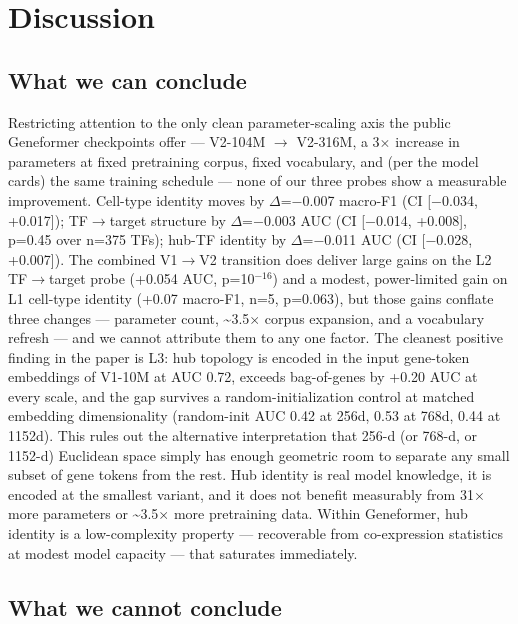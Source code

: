 \documentclass[10pt]{article}
\begin{document}
\section{Discussion}\label{discussion}

\subsection{What we can conclude}\label{what-we-can-conclude}

Restricting attention to the only clean parameter-scaling axis the
public Geneformer checkpoints offer --- V2-104M $\to$ V2-316M, a 3$\times$ increase
in parameters at fixed pretraining corpus, fixed vocabulary, and (per
the model cards) the same training schedule --- none of our three probes
show a measurable improvement. Cell-type identity moves by $\Delta$=$-$0.007
macro-F1 (CI {[}$-$0.034, +0.017{]}); TF$\to$target structure by $\Delta$=$-$0.003 AUC
(CI {[}$-$0.014, +0.008{]}, p=0.45 over n=375 TFs); hub-TF identity by
$\Delta$=$-$0.011 AUC (CI {[}$-$0.028, +0.007{]}). The combined V1$\to$V2 transition
does deliver large gains on the L2 TF$\to$target probe (+0.054 AUC, p=10$^{-16}$)
and a modest, power-limited gain on L1 cell-type identity (+0.07
macro-F1, n=5, p=0.063), but those gains conflate three changes ---
parameter count, \textasciitilde3.5$\times$ corpus expansion, and a vocabulary
refresh --- and we cannot attribute them to any one factor. The cleanest
positive finding in the paper is L3: hub topology is encoded in the
input gene-token embeddings of V1-10M at AUC 0.72, exceeds bag-of-genes
by +0.20 AUC at every scale, and the gap survives a
random-initialization control at matched embedding dimensionality
(random-init AUC 0.42 at 256d, 0.53 at 768d, 0.44 at 1152d). This rules
out the alternative interpretation that 256-d (or 768-d, or 1152-d)
Euclidean space simply has enough geometric room to separate any small
subset of gene tokens from the rest. Hub identity is real model
knowledge, it is encoded at the smallest variant, and it does not
benefit measurably from 31$\times$ more parameters or \textasciitilde3.5$\times$ more
pretraining data. Within Geneformer, hub identity is a low-complexity
property --- recoverable from co-expression statistics at modest model
capacity --- that saturates immediately.

\subsection{What we cannot
conclude}\label{what-we-cannot-conclude}
\end{document}
